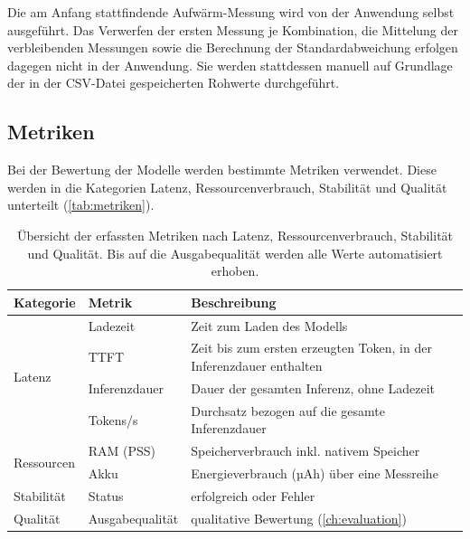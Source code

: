 \noindent Die am Anfang stattfindende Aufwärm-Messung wird von der Anwendung selbst ausgeführt. Das Verwerfen der ersten Messung je Kombination, die Mittelung der verbleibenden Messungen sowie die Berechnung der Standardabweichung erfolgen dagegen nicht in der Anwendung. Sie werden stattdessen manuell auf Grundlage der in der \ac{CSV}-Datei gespeicherten Rohwerte durchgeführt.

\subsection{Metriken}
\label{subsec:metriken}
Bei der Bewertung der Modelle werden bestimmte Metriken verwendet. Diese werden in die Kategorien Latenz, Ressourcenverbrauch, Stabilität und Qualität unterteilt (\autoref{tab:metriken}).
\begin{table}[H]
    \centering
    \caption[Übersicht der Metriken]{Übersicht der erfassten Metriken nach Latenz, Ressourcenverbrauch, Stabilität und Qualität. Bis auf die Ausgabequalität werden alle Werte automatisiert erhoben.}
    \label{tab:metriken}
    \begin{tabularx}{\textwidth}{l l X}
        \toprule
        \textbf{Kategorie} & \textbf{Metrik} & \textbf{Beschreibung} \\
        \midrule
        \multirow{4}{*}{Latenz}
            & Ladezeit    & Zeit zum Laden des Modells \\
            & TTFT        & Zeit bis zum ersten erzeugten Token, in der Inferenzdauer enthalten \\
            & Inferenzdauer & Dauer der gesamten Inferenz, ohne Ladezeit \\
            & Tokens/s    & Durchsatz bezogen auf die gesamte Inferenzdauer \\
        \midrule
        \multirow{2}{*}{Ressourcen}
            & RAM (PSS) & Speicherverbrauch inkl. nativem Speicher \\
            & Akku      & Energieverbrauch (µAh) über eine Messreihe \\
        \midrule
        Stabilität & Status           & erfolgreich oder Fehler \\
        \midrule
        Qualität   & Ausgabequalität  & qualitative Bewertung (\autoref{ch:evaluation}) \\
        \bottomrule
    \end{tabularx}
\end{table}

